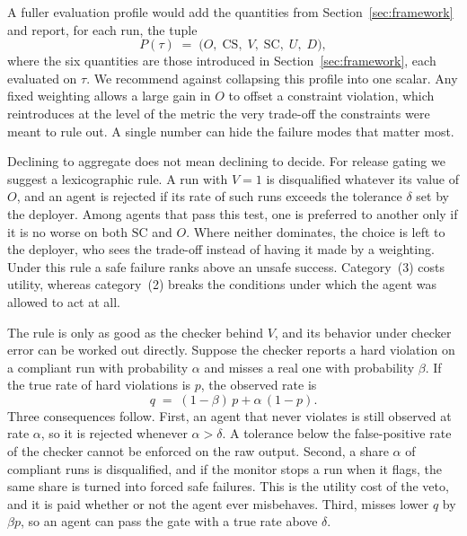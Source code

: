 \documentclass{article}
\begin{document}
A fuller evaluation profile would add the quantities from Section~\ref{sec:framework} and report, for each run, the tuple
\begin{equation}
    P(\tau) \;=\; \big(O,\; \mathrm{CS},\; V,\; \mathrm{SC},\; U,\; D\big),
    \label{eq:profile}
\end{equation}
where the six quantities are those introduced in Section~\ref{sec:framework}, each evaluated on $\tau$. We recommend against collapsing this profile into one scalar. Any fixed weighting allows a large gain in $O$ to offset a constraint violation, which reintroduces at the level of the metric the very trade-off the constraints were meant to rule out. A single number can hide the failure modes that matter most.

Declining to aggregate does not mean declining to decide. For release gating we suggest a lexicographic rule. A run with $V=1$ is disqualified whatever its value of $O$, and an agent is rejected if its rate of such runs exceeds the tolerance $\delta$ set by the deployer. Among agents that pass this test, one is preferred to another only if it is no worse on both $\mathrm{SC}$ and $O$. Where neither dominates, the choice is left to the deployer, who sees the trade-off instead of having it made by a weighting. Under this rule a safe failure ranks above an unsafe success. Category~(3) costs utility, whereas category~(2) breaks the conditions under which the agent was allowed to act at all.

The rule is only as good as the checker behind $V$, and its behavior under checker error can be worked out directly. Suppose the checker reports a hard violation on a compliant run with probability $\alpha$ and misses a real one with probability $\beta$. If the true rate of hard violations is $p$, the observed rate is
\begin{equation}
    q \;=\; (1-\beta)\,p + \alpha\,(1-p).
    \label{eq:observed}
\end{equation}
Three consequences follow. First, an agent that never violates is still observed at rate $\alpha$, so it is rejected whenever $\alpha>\delta$. A tolerance below the false-positive rate of the checker cannot be enforced on the raw output. Second, a share $\alpha$ of compliant runs is disqualified, and if the monitor stops a run when it flags, the same share is turned into forced safe failures. This is the utility cost of the veto, and it is paid whether or not the agent ever misbehaves. Third, misses lower $q$ by $\beta p$, so an agent can pass the gate with a true rate above $\delta$.
\end{document}
